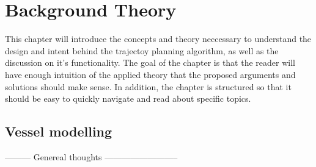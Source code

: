 \section{Background Theory}

This chapter will introduce the concepts and theory neccessary to understand the design and intent behind the trajectoy planning algorithm, as well as the discussion on it's functionality.
The goal of the chapter is that the reader will have enough intuition of the applied theory that the proposed arguments and solutions should make sense. In addition, the chapter is structured
so that it should be easy to quickly navigate and read about specific topics.
\subsection{Vessel modelling}
\iffalse
--------- Genereal thoughts --------------------------

